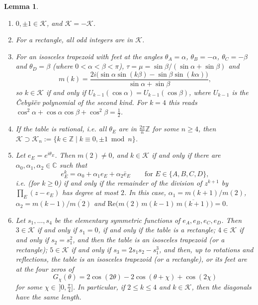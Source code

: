 \documentclass[a4paper,11pt,twoside,leqno]{article}
\newtheorem{lem}[teo]{Lemma}
\newcommand{\ie}[0]{\emph{i.e.} }
\newcommand{\zz}[0]{\ensuremath{\mathbb{Z}}}
\numberwithin{equation}{section}
\begin{document}
\begin{lem}\label{lem-modes}
\begin{enumerate}\renewcommand{\theenumi}{\bfseries (\alph{enumi})}
 \item $0, \pm 1 \in \mathcal{K}$, and $\mathcal{K} = -\mathcal{K}$.
 \item For a rectangle, all odd integers are in $\mathcal{K}$.
 \item For an isosceles trapezoid with feet at the angles $\theta_A = \alpha$, $\theta_B = -\alpha$, $\theta_C = -\beta$ and $\theta_D = \beta$ (where $0 < \alpha < \beta < \pi$), $\tau = \mu = \sin\beta/(\sin \alpha + \sin \beta)$ and
 \[
 m(k) = \frac{2i\big( \sin\alpha \sin(k\beta) - \sin \beta \sin (k \alpha)\big)}{\sin\alpha + \sin \beta},
 \]
 so $k \in \mathcal{K}$ if and only if $U_{k-1}(\cos \alpha) = U_{k-1}(\cos \beta)$,
 where $U_{k-1}$ is the Čebyšëv polynomial of the second kind. For $k=4$ this reads $\cos^2 \alpha + \cos \alpha \cos \beta + \cos^2 \beta = \frac{1}{2}$.
 \item If the table is \emph{rational}, \ie all $\theta_E$ are in $\frac{2\pi}{n}\zz$ for some $n \geq 4$, then $\mathcal{K} \supset \mathcal{K}_n := \{k \in \zz \mid k \equiv 0, \pm 1 \bmod n\}$.
 \item Let $e_E = e^{i\theta_E}$. Then $m(2) \neq 0$, and $k \in \mathcal{K}$ if and only if there are $\alpha_0, \alpha_1, \alpha_2 \in \mathbb{C}$ such that
 \[
 e_E^k = \alpha_0 + \alpha_1 e_E + \alpha_2 \bar e_E \qquad \text{for } E \in \{A,B,C,D\},
 \]
 \ie (for $k \geq 0$) if and only if the remainder of the division of $z^{k+1}$ by $\prod_E (z - e_E)$ has degree at most $2$. In this case, $\alpha_1 = m(k+1)/m(2)$, $\alpha_2 = m(k-1)/\overline{m(2)}$ and $\mathrm{Re}\big(m(2)\, m(k-1)\, \overline{m(k+1)}\big) = 0$.
 \item Let $s_1, \ldots, s_4$ be the elementary symmetric functions of $e_A, e_B, e_C, e_D$. Then $3 \in \mathcal{K}$ if and only if $s_1 = 0$, if and only if the table is a rectangle; $4 \in \mathcal{K}$ if and only if $s_2 = s_1^2$, and then the table is an isosceles trapezoid (or a rectangle); $5 \in \mathcal{K}$ if and only if $s_3 = 2 s_1 s_2 - s_1^3$, and then, up to rotations and reflections, the table is an isosceles trapezoid (or a rectangle), or its feet are at the four zeros of
 \[
 G_\chi(\theta) = 2 \cos(2\theta) - 2\cos(\theta + \chi) + \cos(2\chi)
 \]
 for some $\chi \in \,]0, \frac{\pi}{4}]$. In particular, if $2 \leq k \leq 4$ and $k \in \mathcal{K}$, then the diagonals have the same length.
\end{enumerate}
\end{lem}
\end{document}
